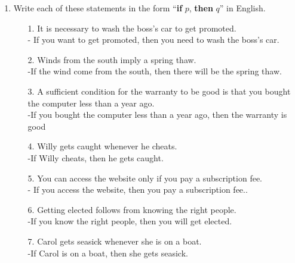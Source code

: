 \documentclass[11pt]{article}
\begin{document}
\begin{enumerate}
\newpage
\item Write each of these statements in the form ``\textbf{if} $p$, \textbf{then} $q$'' in English.
  \begin{enumerate}
  \item[1.] It is necessary to wash the boss’s car to get promoted.\\
  
  - If you want to get promoted, then you need to wash the boss's car.
\\
  
  \item[2.] Winds from the south imply a spring thaw.\\
  
  -If the wind come from the south, then there will be the spring thaw.\\
  
  \item[3.] A sufficient condition for the warranty to be good is that you bought the computer less than a year ago.\\
  
  -If you bought the computer less than a year ago, then the warranty is good\\
  
  \item[4.] Willy gets caught whenever he cheats.\\
  
  -If Willy cheats, then he gets caught.\\

  \item[5.] You can access the website only if you pay a subscription fee.\\
  
  - If you access the website, then you pay a subscription fee..\\

  \item[6.] Getting elected follows from knowing the right people.\\
  
  -If you know the right people, then you will get elected.\\
  
  \item[7.] Carol gets seasick whenever she is on a boat.\\
  
  -If Carol is on a boat, then she gets seasick.\\
  \end{enumerate}


\end{enumerate}
\end{document}
